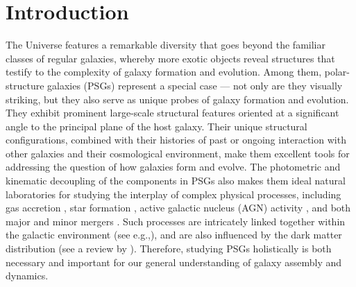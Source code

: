 \documentclass{aa}
\begin{document}



\maketitle
\nolinenumbers

\section{Introduction} \label{sec:intro}

The Universe features a remarkable diversity that goes beyond the familiar classes of regular galaxies, whereby more exotic objects reveal structures that testify to the complexity of galaxy formation and evolution. Among them, polar-structure galaxies (PSGs) represent a special case --- not only are they visually striking, but they also serve as unique probes of galaxy formation and evolution. They exhibit prominent large-scale structural features oriented at a significant angle to the principal plane of the host galaxy. Their unique structural configurations, combined with their histories of past or ongoing interaction with other galaxies and their cosmological environment, make them excellent tools for addressing the question of how galaxies form and evolve. The photometric and kinematic decoupling of the components in PSGs also makes them ideal natural laboratories for studying the interplay of complex physical processes, including gas accretion \citep{2008ApJ...689..678B,2014A&A...569A..83C}, star formation \citep{2015MNRAS.447.2287R,2025PASA...42...56A}, active galactic nucleus (AGN) activity \citep{2020AstL...46..501S,2022MNRAS.512.2556H}, and both major and minor mergers \citep{1997A&A...325..933R,2003ApJ...587L..23S,2003A&A...401..817B,2016A&A...585A.156O,2020MNRAS.491.1887Q,2022RAA....22k5003M}. Such processes are intricately linked together within the galactic environment (see e.g.,\citealt{2006PASP..118..517B}), and are also influenced by the dark matter distribution (see a review by \citealt{2018ARA&A..56..435W}). Therefore, studying PSGs holistically is both necessary and important for our general understanding of galaxy assembly and dynamics.
\end{document}

